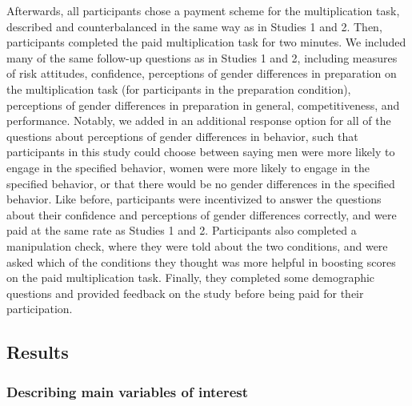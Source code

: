 \documentclass[a4paper, nobind]{templates/ociamthesis}
\begin{document}
Afterwards, all participants chose a payment scheme for the multiplication task, described and counterbalanced in the same way as in Studies 1 and 2. Then, participants completed the paid multiplication task for two minutes. We included many of the same follow-up questions as in Studies 1 and 2, including measures of risk attitudes, confidence, perceptions of gender differences in preparation on the multiplication task (for participants in the preparation condition), perceptions of gender differences in preparation in general, competitiveness, and performance. Notably, we added in an additional response option for all of the questions about perceptions of gender differences in behavior, such that participants in this study could choose between saying men were more likely to engage in the specified behavior, women were more likely to engage in the specified behavior, or that there would be no gender differences in the specified behavior. Like before, participants were incentivized to answer the questions about their confidence and perceptions of gender differences correctly, and were paid at the same rate as Studies 1 and 2. Participants also completed a manipulation check, where they were told about the two conditions, and were asked which of the conditions they thought was more helpful in boosting scores on the paid multiplication task. Finally, they completed some demographic questions and provided feedback on the study before being paid for their participation.

\hypertarget{results-2}{%
\subsection{Results}\label{results-2}}

\hypertarget{describing-main-variables-of-interest-2}{%
\subsubsection{Describing main variables of interest}\label{describing-main-variables-of-interest-2}}
\end{document}
